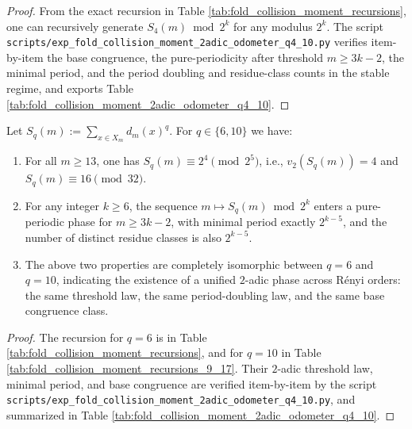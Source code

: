 \begin{proof}
From the exact recursion in Table \ref{tab:fold_collision_moment_recursions}, one can recursively generate \(S_4(m)\bmod 2^k\) for any modulus \(2^k\).
The script \texttt{scripts/exp\_fold\_collision\_moment\_2adic\_odometer\_q4\_10.py} verifies item-by-item the base congruence, the pure-periodicity after threshold \(m\ge 3k-2\), the minimal period, and the period doubling and residue-class counts in the stable regime, and exports Table \ref{tab:fold_collision_moment_2adic_odometer_q4_10}.
\end{proof}
\begin{conclusion}[Unified \(2\)-adic Phase for \texorpdfstring{$q=6,10$}{q=6,10}: Fixed \texorpdfstring{$v_2$}{v2} and Linear Threshold \texorpdfstring{$3k-2$}{3k-2}]\label{con:pom-s6-s10-unified-2adic-phase}
Let \(S_q(m):=\sum_{x\in X_m} d_m(x)^q\).
For \(q\in\{6,10\}\) we have:
\begin{enumerate}
  \item For all \(m\ge 13\), one has \(S_q(m)\equiv 2^4\pmod{2^5}\), i.e., \(v_2(S_q(m))=4\) and \(S_q(m)\equiv 16\pmod{32}\).
  \item For any integer \(k\ge 6\), the sequence \(m\mapsto S_q(m)\bmod 2^k\) enters a pure-periodic phase for \(m\ge 3k-2\), with minimal period exactly \(2^{k-5}\), and the number of distinct residue classes is also \(2^{k-5}\).
  \item The above two properties are completely isomorphic between \(q=6\) and \(q=10\), indicating the existence of a unified \(2\)-adic phase across Rényi orders: the same threshold law, the same period-doubling law, and the same base congruence class.
\end{enumerate}
\end{conclusion}
\begin{proof}
The recursion for \(q=6\) is in Table \ref{tab:fold_collision_moment_recursions}, and for \(q=10\) in Table \ref{tab:fold_collision_moment_recursions_9_17}.
Their \(2\)-adic threshold law, minimal period, and base congruence are verified item-by-item by the script \texttt{scripts/exp\_fold\_collision\_moment\_2adic\_odometer\_q4\_10.py}, and summarized in Table \ref{tab:fold_collision_moment_2adic_odometer_q4_10}.
\end{proof}

